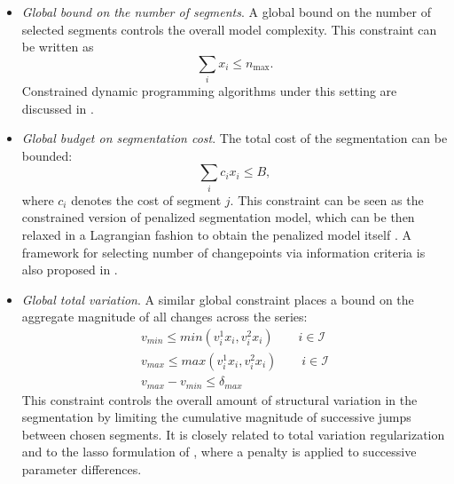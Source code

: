 \documentclass[preprints,article,submit,pdftex,moreauthors]{Definitions/mdpi}
\begin{document}
\begin{itemize}
	\item {\it Global bound on the number of segments}.
	A global bound on the number of selected segments controls the overall model complexity. This constraint can be written as 
	\begin{equation}
		\sum_i x_i \le n_{\max}.
	\end{equation}
	Constrained dynamic programming algorithms under this setting are discussed in \cite{hocking2017constrained}.
	
	\item {\it Global budget on segmentation cost}. 
	The total cost of the segmentation can be bounded:
	\begin{equation}
		\sum_{i} c_i x_i \le B,
	\end{equation}
	where $c_i$ denotes the cost of segment $j$. This constraint can be seen as the constrained version of penalized segmentation model, which can be then relaxed in a Lagrangian fashion to obtain the penalized model itself \cite{KFE12}. 
	A framework for selecting number of changepoints via information criteria is also proposed in \cite{Y88}.
	
	\item {\it Global total variation}.
	A similar global constraint places a bound on the aggregate magnitude of all changes across the series:
	\begin{equation}
		\begin{split}
			v_{min} \leq min(v^1_i x_i,v^2_i x_i) \qquad i \in \mathcal{I} \\ 
			v_{max} \leq max(v^1_i x_i,v^2_i x_i) \qquad i \in \mathcal{I} \\ 
			v_{max} - v_{min} \leq \delta_{max}
		\end{split}
	\end{equation}
	This constraint controls the overall amount of structural variation in the segmentation by limiting the cumulative magnitude of successive jumps between chosen segments. It is closely related to total variation regularization and to the lasso formulation of \cite{tibshirani2005sparsity}, where a penalty is applied to successive parameter differences. 


\end{itemize}
\end{document}
